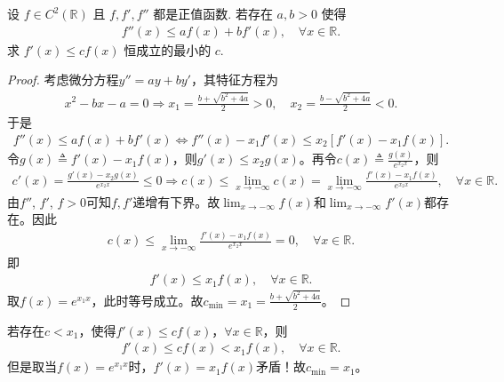 \documentclass[../../main.tex]{subfiles}
\begin{document}
\begin{example}
设 $f \in C^2(\mathbb{R})$ 且 $f, f', f''$ 都是正值函数. 若存在 $a, b > 0$ 使得
\begin{align*}
f''(x) \leqslant a f(x) + b f'(x), \quad \forall x \in \mathbb{R}.
\end{align*}
求 $f'(x) \leqslant c f(x)$ 恒成立的最小的 $c$.
\end{example}
\begin{proof}
考虑微分方程$y'' = ay + by'$，其特征方程为
\begin{align*}
x^2 - bx - a = 0 \Rightarrow x_1 = \frac{b + \sqrt{b^2 + 4a}}{2} > 0, \quad x_2 = \frac{b - \sqrt{b^2 + 4a}}{2} < 0.
\end{align*}
于是
\begin{align*}
f''(x) \leqslant a f(x) + b f'(x) \Longleftrightarrow f''(x) - x_1 f'(x) \leqslant x_2 \left[ f'(x) - x_1 f(x) \right].
\end{align*}
令$g(x) \triangleq f'(x) - x_1 f(x)$，则$g'(x) \leqslant x_2 g(x)$。再令$c(x) \triangleq \frac{g(x)}{e^{x_2 x}}$，则
\begin{align*}
c'(x) = \frac{g'(x) - x_2 g(x)}{e^{x_2 x}} \leqslant 0 \Rightarrow c(x) \leqslant \lim_{x \rightarrow -\infty} c(x) = \lim_{x \rightarrow -\infty} \frac{f'(x) - x_1 f(x)}{e^{x_2 x}}, \quad \forall x \in \mathbb{R}.
\end{align*}
由$f''$, $f'$, $f > 0$可知$f, f'$递增有下界。故$\lim_{x \rightarrow -\infty} f(x)$和$\lim_{x \rightarrow -\infty} f'(x)$都存在。因此
\begin{align*}
c(x) \leqslant \lim_{x \rightarrow -\infty} \frac{f'(x) - x_1 f(x)}{e^{x_2 x}} = 0, \quad \forall x \in \mathbb{R}.
\end{align*}
即
\begin{align*}
f'(x) \leqslant x_1 f(x), \quad \forall x \in \mathbb{R}.
\end{align*}
取$f(x) = e^{x_1 x}$，此时等号成立。故$c_{\min} = x_1 = \frac{b + \sqrt{b^2 + 4a}}{2}$。

\end{proof}
\begin{remark}
若存在$c < x_1$，使得$f'(x) \leqslant c f(x)$，$\forall x \in \mathbb{R}$，则
\begin{align*}
f'(x) \leqslant c f(x) < x_1 f(x), \quad \forall x \in \mathbb{R}.
\end{align*}
但是取当$f(x) = e^{x_1 x}$时，$f'(x) = x_1 f(x)$矛盾！故$c_{\min} = x_1$。
\end{remark}
\end{document}
